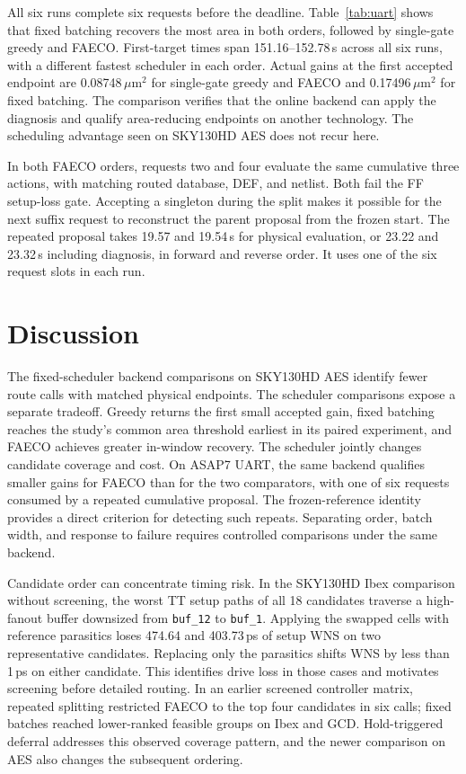 \documentclass[journal]{IEEEtran}
\newcommand{\um}{\ensuremath{\mu\mathrm{m}^{2}}}
\begin{document}
All six runs complete six requests before the deadline. Table~\ref{tab:uart} shows that fixed batching recovers the most area in both orders, followed by single-gate greedy and FAECO. First-target times span 151.16--152.78\,s across all six runs, with a different fastest scheduler in each order. Actual gains at the first accepted endpoint are 0.08748\,\um{} for single-gate greedy and FAECO and 0.17496\,\um{} for fixed batching. The comparison verifies that the online backend can apply the diagnosis and qualify area-reducing endpoints on another technology. The scheduling advantage seen on SKY130HD AES does not recur here.

In both FAECO orders, requests two and four evaluate the same cumulative three actions, with matching routed database, DEF, and netlist. Both fail the FF setup-loss gate. Accepting a singleton during the split makes it possible for the next suffix request to reconstruct the parent proposal from the frozen start. The repeated proposal takes 19.57 and 19.54\,s for physical evaluation, or 23.22 and 23.32\,s including diagnosis, in forward and reverse order. It uses one of the six request slots in each run.

\section{Discussion}

The fixed-scheduler backend comparisons on SKY130HD AES identify fewer route calls with matched physical endpoints. The scheduler comparisons expose a separate tradeoff. Greedy returns the first small accepted gain, fixed batching reaches the study's common area threshold earliest in its paired experiment, and FAECO achieves greater in-window recovery. The scheduler jointly changes candidate coverage and cost. On ASAP7 UART, the same backend qualifies smaller gains for FAECO than for the two comparators, with one of six requests consumed by a repeated cumulative proposal. The frozen-reference identity provides a direct criterion for detecting such repeats. Separating order, batch width, and response to failure requires controlled comparisons under the same backend.

Candidate order can concentrate timing risk. In the SKY130HD Ibex comparison without screening, the worst TT setup paths of all 18 candidates traverse a high-fanout buffer downsized from \texttt{buf\_12} to \texttt{buf\_1}. Applying the swapped cells with reference parasitics loses 474.64 and 403.73\,ps of setup WNS on two representative candidates. Replacing only the parasitics shifts WNS by less than 1\,ps on either candidate. This identifies drive loss in those cases and motivates screening before detailed routing. In an earlier screened controller matrix, repeated splitting restricted FAECO to the top four candidates in six calls; fixed batches reached lower-ranked feasible groups on Ibex and GCD. Hold-triggered deferral addresses this observed coverage pattern, and the newer comparison on AES also changes the subsequent ordering.
\end{document}

